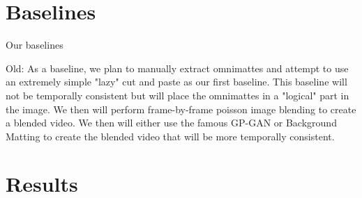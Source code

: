 \documentclass{article}
\begin{document}
\section{Baselines}
Our baselines 


Old:
As a baseline, we plan to manually extract omnimattes and attempt to use an extremely simple "lazy" cut and paste as our first baseline. This baseline will not be temporally consistent but will place the omnimattes in a "logical" part in the image. We then will perform frame-by-frame poisson image blending to create a blended video. We then will either use the famous GP-GAN\cite{10.1145/3343031.3350944} or Background Matting \cite{BMSengupta20} to create the blended video that will be more temporally consistent.

\section{Results}


\printbibliography
\end{document}

